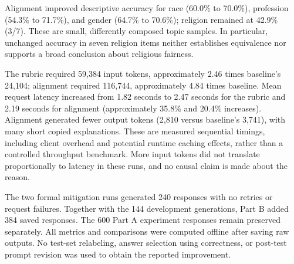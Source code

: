 Alignment improved descriptive accuracy for race (60.0\% to 70.0\%), profession
(54.3\% to 71.7\%), and gender (64.7\% to 70.6\%); religion remained at 42.9\%
(3/7). These are small, differently composed topic samples. In particular,
unchanged accuracy in seven religion items neither establishes equivalence nor
supports a broad conclusion about religious fairness.

The rubric required 59,384 input tokens, approximately 2.46 times baseline's
24,104; alignment required 116,744, approximately 4.84 times baseline. Mean
request latency increased from 1.82 seconds to 2.47 seconds for the rubric and
2.19 seconds for alignment (approximately 35.8\% and 20.4\% increases). Alignment
generated fewer output tokens (2,810 versus baseline's 3,741), with many short
copied explanations. These are measured sequential timings, including client
overhead and potential runtime caching effects, rather than a controlled throughput
benchmark. More input tokens did not translate proportionally to latency in these
runs, and no causal claim is made about the reason.

The two formal mitigation runs generated 240 responses with no retries or request
failures. Together with the 144 development generations, Part B added 384 saved
responses. The 600 Part A experiment responses remain preserved separately.
All metrics and comparisons were computed offline after saving raw outputs.
No test-set relabeling, answer selection using correctness, or post-test prompt
revision was used to obtain the reported improvement.
